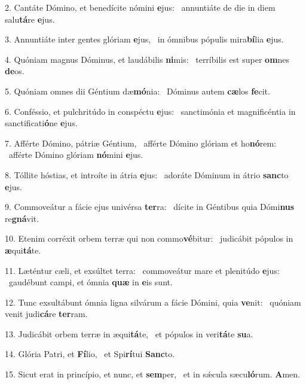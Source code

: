 2. Cantáte Dómino, et benedícite nómini \textbf{e}jus: \ast\  annuntiáte de die in diem salu\textbf{tá}re \textbf{e}jus.\

3. Annuntiáte inter gentes glóriam \textbf{e}jus, \ast\  in ómnibus pópulis mira\textbf{bí}lia \textbf{e}jus.\

4. Quóniam magnus Dóminus, et laudábilis \textbf{ni}mis: \ast\  terríbilis est super \textbf{om}nes \textbf{de}os.\

5. Quóniam omnes dii Géntium dæ\textbf{mó}nia: \ast\  Dóminus autem \textbf{cæ}los \textbf{fe}cit.\

6. Conféssio, et pulchritúdo in conspéctu \textbf{e}jus: \ast\  sanctimónia et magnificéntia in sanctificati\textbf{ó}ne \textbf{e}jus.\

7. Afférte Dómino, pátriæ Géntium, \dag\  afférte Dómino glóriam et ho\textbf{nó}rem: \ast\  afférte Dómino glóriam \textbf{nó}mini \textbf{e}jus.\

8. Tóllite hóstias, et introíte in átria \textbf{e}jus: \ast\  adoráte Dóminum in átrio \textbf{sanc}to \textbf{e}jus.\

9. Commoveátur a fácie ejus univérsa \textbf{ter}ra: \ast\  dícite in Géntibus quia Dómi\textbf{nus} re\textbf{gná}vit.\

10. Etenim corréxit orbem terræ qui non commo\textbf{vé}bitur: \ast\  judicábit pópulos in \textbf{æ}qui\textbf{tá}te.\

11. Læténtur cæli, et exsúltet terra: \dag\  commoveátur mare et plenitúdo \textbf{e}jus: \ast\  gaudébunt campi, et ómnia \textbf{quæ} in \textbf{e}is sunt.\

12. Tunc exsultábunt ómnia ligna silvárum a fácie Dómini, quia \textbf{ve}nit: \ast\  quóniam venit judi\textbf{cá}re \textbf{ter}ram.\

13. Judicábit orbem terræ in æqui\textbf{tá}te, \ast\  et pópulos in veri\textbf{tá}te \textbf{su}a.\

14. Glória Patri, et \textbf{Fí}lio, \ast\  et Spi\textbf{rí}tui \textbf{Sanc}to.\

15. Sicut erat in princípio, et nunc, et \textbf{sem}per, \ast\  et in sǽcula sæcu\textbf{ló}rum. \textbf{A}men.\

